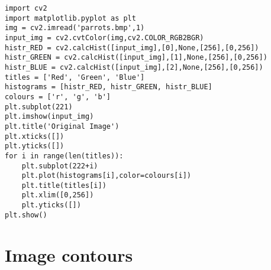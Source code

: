 \documentclass{labo}
\begin{document}
\begin{verbatim}
import cv2 
import matplotlib.pyplot as plt 
img = cv2.imread('parrots.bmp',1) 
input_img = cv2.cvtColor(img,cv2.COLOR_RGB2BGR) 
histr_RED = cv2.calcHist([input_img],[0],None,[256],[0,256]) 
histr_GREEN = cv2.calcHist([input_img],[1],None,[256],[0,256]) 
histr_BLUE = cv2.calcHist([input_img],[2],None,[256],[0,256]) 
titles = ['Red', 'Green', 'Blue']
histograms = [histr_RED, histr_GREEN, histr_BLUE]
colours = ['r', 'g', 'b']
plt.subplot(221)
plt.imshow(input_img)
plt.title('Original Image')
plt.xticks([])
plt.yticks([]) 
for i in range(len(titles)):
	plt.subplot(222+i)
	plt.plot(histograms[i],color=colours[i]) 
	plt.title(titles[i]) 
	plt.xlim([0,256])
	plt.yticks([])
plt.show()
\end{verbatim}

\section*{Image contours}








\begin{verbatim}

\end{verbatim}

\end{document}
